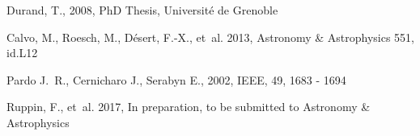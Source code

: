 \documentclass[]{aa} %
\begin{document}
\begin{thebibliography}{16}
Durand, T., 2008, 
PhD Thesis, Universit\' e de Grenoble

Calvo, M., Roesch, M., D\'esert, F.-X., {et~al.} 2013, 
Astronomy \& Astrophysics 551, id.L12

Pardo J.~R., Cernicharo J., Serabyn E., 2002, 
IEEE, 49, 1683 - 1694

Ruppin, F., {et~al.} 2017, 
In preparation, to be submitted to Astronomy \& Astrophysics

\end{thebibliography}

%
% 
\end{document}
